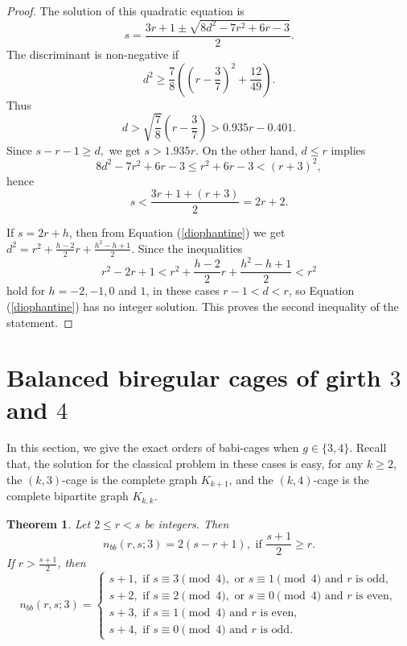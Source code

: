 \documentclass[a4paper,11pt]{article}
\newtheorem{theorem}{Theorem}[section]
\begin{document}
\begin{proof}
The solution of this quadratic equation is
$$s=\frac{3r+1\pm \sqrt{8d^2-7r^2+6r-3}}{2}.$$
The discriminant is non-negative if 
$$d^2\geq \frac{7}{8}\left( \left( r-\frac{3}{7}\right) ^2+\frac{12}{49}\right) .$$
Thus 
$$d>\sqrt{\frac{7}{8}}\left( r-\frac{3}{7}\right)> 0.935r-0.401 .$$
Since $s-r-1\geq d,$ we get $s>1.935r.$
On the other hand, $d\leq r$ implies 
$$8d^2-7r^2+6r-3\leq r^2+6r-3 < (r+3)^2,$$
hence 
$$s < \frac{3r+1+(r+3)}{2}=2r+2.$$

If $s=2r+h$, then from Equation (\ref{diophantine}) we get
$d^2=r^2+\frac{h-2}{2}r+\frac{h^2-h+1}{2}$. Since the inequalities 
$$r^2-2r+1< r^2+\frac{h-2}{2}r+\frac{h^2-h+1}{2}< r^2$$
hold for $h=-2,-1,0$ and $1$, in these cases $r-1<d<r$, so Equation (\ref{diophantine}) has no integer solution. This proves the second inequality of the statement.
\end{proof}



\section{Balanced biregular cages of girth $3$ and $4$}\label{girth3and4}

In this section, we give the exact orders of babi-cages when $g\in \{3,4\}$. 
Recall that, the solution for the classical problem in these cases is easy, for any $k\geq 2$, the $(k,3)$-cage is the complete graph $K_{k+1}$, and the $(k,4)$-cage is the complete bipartite graph $K_{k,k}$.


\begin{theorem}
Let $2\leq r<s$ be integers. Then 
$$n_{bb}(r,s;3)=2(s-r+1), \text{ if }\frac{s+1}{2} \geq r.$$
If $r>\frac{s+1}{2} $, then
$$n_{bb}(r,s;3)=
\begin{cases}
s+1, \text{ if } s\equiv 3\pmod 4, \text { or } s\equiv 1\pmod 4 \text{ and } r \text{ is odd}, \\
s+2, \text{ if }  s\equiv 2\pmod 4, \text { or } s\equiv 0\pmod 4   \text{ and } r \text{ is even}, \\
s+3, \text{ if } s\equiv 1\pmod 4 \text{ and } r \text{ is even}, \\
s+4, \text{ if } s\equiv 0\pmod 4  \text{ and } r \text{ is odd}.
\end{cases}
$$
\end{theorem}
\end{document}
